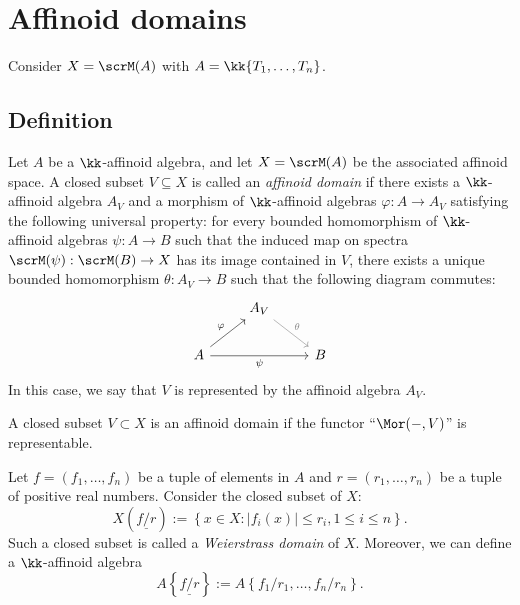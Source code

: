 \section{Affinoid domains}

    Consider \(X = \scrM(A)\) with \(A = \kk\{T_1,\ldots,T_n\}\).

\subsection{Definition}


    \begin{definition}\label{def:affinoid_domains}
        Let \(A\) be a \(\kk\)-affinoid algebra, and let \(X = \scrM(A)\) be the associated affinoid space.
        A closed subset \(V \subseteq X\) is called an \emph{affinoid domain} if there exists a \(\kk\)-affinoid algebra \(A_V\) and a morphism of \(\kk\)-affinoid algebras \(\varphi: A \to A_V\) satisfying the following universal property:
        for every bounded homomorphism of \(\kk\)-affinoid algebras \(\psi: A \to B\) such that the induced map on spectra \(\scrM(\psi): \scrM(B) \to X\) has its image contained in \(V\), there exists a unique bounded homomorphism \(\theta: A_V \to B\) such that the following diagram commutes:
        \[
        \begin{tikzcd}
            & A_V  \arrow[dr, gray, "\theta"] & \\
            A \arrow[ur, "\varphi"] \arrow[rr, "\psi"'] & & B
        \end{tikzcd}
        \]
        In this case, we say that \(V\) is represented by the affinoid algebra \(A_V\).
    \end{definition}
    \begin{slogan}
        A closed subset \(V \subset X\) is an affinoid domain if the functor ``\(\Mor(-, V)\)'' is representable.
    \end{slogan}



    \begin{construction}\label{constr:weierstrass_domain}
        Let \(f=(f_1,\ldots,f_n)\) be a tuple of elements in \(A\) and \(r=(r_1,\ldots,r_n)\) be a tuple of positive real numbers.
        Consider the closed subset of \(X\):
        \[ X\left(\underline{f/r}\right) := \left\{ x \in X \colon |f_i(x)| \le r_i, 1 \le i \le n \right\}. \]
        Such a closed subset is called a \emph{Weierstrass domain} of \(X\).
        Moreover, we can define a \(\kk\)-affinoid algebra
        \[ A\left\{ \underline{f/r} \right\} := A\left\{ f_1/r_1,\ldots,f_n/r_n \right\}. \]
    \end{construction}

